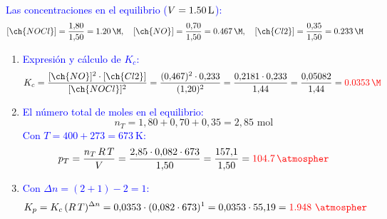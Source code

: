 \begin{exerciseEVAU}
\begin{solu}
    \textcolor{blue}{Las concentraciones en el equilibrio (\(V = \qty{1{,}50}{\L}\)):}
    \[
        [\ch{NOCl}] = \frac{1{,}80}{1{,}50} = \qty{1{,}20}{\M},\quad [\ch{NO}] = \frac{0{,}70}{1{,}50} = \qty{0{,}467}{\M},\quad [\ch{Cl2}] = \frac{0{,}35}{1{,}50} = \qty{0{,}233}{\M}
    \]

    \begin{enumerate}[label=\letraminuscula]
        \item \textcolor{blue}{Expresión y cálculo de \(K_c\):}
        \[
            K_c = \frac{[\ch{NO}]^2\cdot[\ch{Cl2}]}{[\ch{NOCl}]^2} = \frac{(0{,}467)^2\cdot 0{,}233}{(1{,}20)^2} = \frac{0{,}2181\cdot0{,}233}{1{,}44} = \frac{0{,}05082}{1{,}44} = \textcolor{red}{\qty{0{,}0353}{\M}}
        \]

        \item \textcolor{blue}{El número total de moles en el equilibrio:}
        \[
            n_T = 1{,}80 + 0{,}70 + 0{,}35 = 2{,}85 \text{ mol}
        \]
        \textcolor{blue}{Con \(T = 400 + 273 = \qty{673}{\K}\):}
        \[
            p_T = \frac{n_T\,R\,T}{V} = \frac{2{,}85\cdot0{,}082\cdot673}{1{,}50} = \frac{157{,}1}{1{,}50} = \textcolor{red}{\qty{104{,}7}{\atmospher}}
        \]

        \item \textcolor{blue}{Con \(\Delta n = (2+1) - 2 = 1\):}
        \[
            K_p = K_c\,(R\,T)^{\Delta n} = 0{,}0353\cdot(0{,}082\cdot673)^1 = 0{,}0353\cdot55{,}19 = \textcolor{red}{\num{1{,}948}\ \unit{\atmospher}}
        \]
    \end{enumerate}

    \end{solu}
\end{exerciseEVAU}


